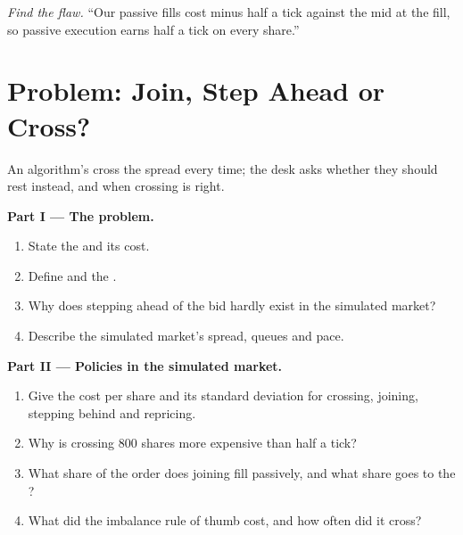 \begin{exercise}[$\star\star\star$]\label{exo:mx:child-order-placement:8}
\emph{Find the flaw.} ``Our passive fills cost minus half a tick against the mid at the fill, so passive execution earns half a tick on every share.''
\end{exercise}

\section{Problem: Join, Step Ahead or Cross?}

\begin{problem}\label{pb:mx:child-order-placement:1}
An algorithm's  cross the spread every time; the desk asks whether they should rest instead, and when crossing is right.

\medskip\noindent\textbf{Part I --- The problem.}
\begin{enumerate}
\item State the  and its cost.
\item Define  and the .
\item Why does stepping ahead of the bid hardly exist in the simulated market?
\item Describe the simulated market's spread, queues and pace.
\end{enumerate}

\medskip\noindent\textbf{Part II --- Policies in the simulated market.}
\begin{enumerate}[resume]
\item Give the cost per share and its standard deviation for crossing, joining, stepping behind and repricing.
\item Why is crossing 800 shares more expensive than half a tick?
\item What share of the order does joining fill passively, and what share goes to the ?
\item What did the imbalance rule of thumb cost, and how often did it cross?
\end{enumerate}


\end{problem}
